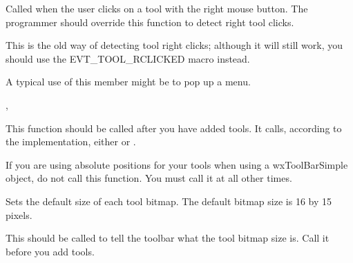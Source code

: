 \label{wxtoolbaronrightclick}


Called when the user clicks on a tool with the right mouse button. The
programmer should override this function to detect right tool clicks.

This is the old way of detecting tool right clicks; although it will still work,
you should use the EVT\_TOOL\_RCLICKED macro instead.






A typical use of this member might be to pop up a menu.


,\rtfsp
{}

\label{wxtoolbarrealize}


This function should be called after you have added tools. It
calls, according to the implementation,
either  or
 .

If you are using absolute positions for your tools when using a wxToolBarSimple object,
do not call this function. You must call it at all other times.

\label{wxtoolbarsettoolbitmapsize}


Sets the default size of each tool bitmap. The default bitmap size is 16 by 15 pixels.




This should be called to tell the toolbar what the tool bitmap size is. Call
it before you add tools.

